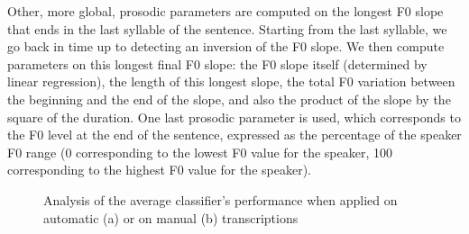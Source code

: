 \documentclass[conference]{IEEEtran}
\begin{document}
Other, more global, prosodic parameters are computed on the longest F0 slope that ends in the last syllable of the sentence.  
Starting from the last syllable, we go back in time up to detecting an inversion of the F0 slope. 
We then compute parameters on this longest final F0 slope: the F0 slope itself (determined by linear regression), the length of this longest slope, the total F0 variation between the beginning and the end of the slope, and also the product of the slope by the square of the duration. 
One last prosodic parameter is used, which corresponds to the F0 level at the end of the sentence, expressed as the percentage of the speaker F0 range (0 corresponding to the lowest F0 value for the speaker, 100 corresponding to the highest F0 value for the speaker). 


\begin{figure}[!t] 
\centerline
{
\hfil
{}
}
\caption{Analysis of the average classifier's performance when applied on automatic (a) or on manual (b) transcriptions}
\label{Fig:PLC}
\end{figure}
\end{document}

